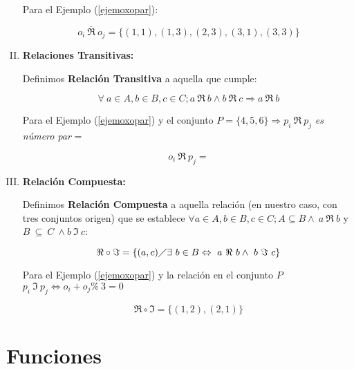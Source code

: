 \begin{enumerate}[I.]
{\ejem Para el Ejemplo (\ref{ejemoxopar}):

\begin{equation}
o_i\ \overline{\Re}\ o_j = \{(1,1),(1,3),(2,3),(3,1),(3,3)\}
\end{equation}

}
\item \textbf{Relaciones Transitivas:}{

 Definimos \textbf{Relación Transitiva} a aquella que cumple:

\begin{equation}
\forall\ a \in A, b \in B, c \in C; a\ \Re\ b \wedge b\ \Re\ c \Rightarrow a\ 
\Re\ b
\end{equation}

\ejem Para el Ejemplo (\ref{ejemoxopar}) y el conjunto $P = \{4,5,6\} 
\Rightarrow p_i\ \Re\ p_j$ \textit{es número par} =

\begin{equation}
o_i\ \Re\ p_j =
\end{equation}
}
\item \textbf{Relación Compuesta:}{

 Definimos \textbf{Relación Compuesta} a aquella relación (en nuestro 
caso, 
con tres conjuntos origen) que se establece $\forall a \in A, b \in B, c \in C; 
A \subseteq B \wedge\ a\ \Re\ b$ y $B\ \subseteq\ C\ \wedge b\ \Im\ c$:

\begin{equation}
\Re \circ \Im = \{(a,c) \diagup \exists\ b \in B \Leftrightarrow\ a\ \Re\ b 
\wedge\ b\ \Im\ c\}
\end{equation}

\ejem Para el Ejemplo (\ref{ejemoxopar}) y la relación en el conjunto $P$ $p_i\ 
\Im\ p_j \Leftrightarrow o_i + o_j \%\ 3 = 0$

\begin{equation}
\Re \circ \Im = \{(1,2),(2,1)\}
\end{equation}

}

\end{enumerate}


\section{Funciones}

